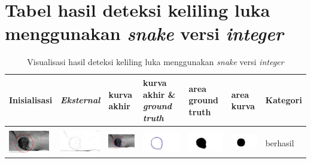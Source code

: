 \chapter{Tabel hasil deteksi keliling luka menggunakan \emph{snake} versi \emph{integer}}
\begin{table}[H]
	\centering
	\caption{Visualisasi hasil deteksi keliling luka menggunakan \emph{snake} versi \emph{integer}}
	\label{tabel_hasil_1}
	\begin{tabular}{|m{0.7in}|m{0.7in}|m{0.7in}|m{0.7in}|m{0.7in}|m{0.7in}|m{0.7in}|}
		\hline
		\textbf{Inisialisasi} & \textbf{\emph{Eksternal}} & \textbf{kurva akhir} & \textbf{kurva akhir \& \emph{ground truth}}& \textbf{area ground truth} & \textbf{area kurva} & \textbf{Kategori} \\
		\hline
		
		&  &  & & & &  \\
		\includegraphics[width=0.7in]{dataset/dataset_3/luka_hitam/ready/5_integer_init.jpg}&
		\includegraphics[width=0.7in]{dataset/dataset_3/luka_hitam/ready/5_integer_ext.jpg}&
		\includegraphics[width=0.7in]{dataset/dataset_3/luka_hitam/ready/5_integer_result.jpg}&
		\includegraphics[width=0.7in]{dataset/dataset_3/luka_hitam/ready/5_gt_r_integer.jpg}&
		\includegraphics[width=0.7in]{dataset/dataset_3/luka_hitam/ready/5_r.jpg}&
		\includegraphics[width=0.7in]{dataset/dataset_3/luka_hitam/ready/5_integer_r.jpg}&
		berhasil\\
		\hline
		

\end{tabular}
\end{table}
